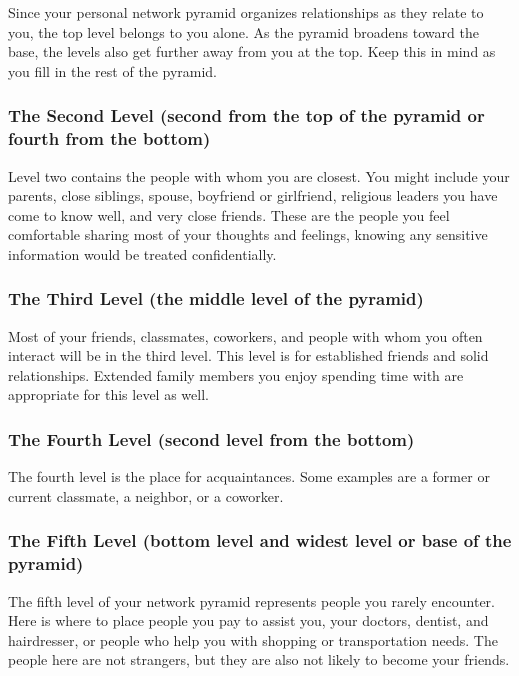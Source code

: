 Since your personal network pyramid organizes relationships as they relate to you, the top level belongs to you alone. As the pyramid broadens toward the base, the levels also get further away from you at the top. Keep this in mind as you fill in the rest of the pyramid.

\subsubsection*{The Second Level (second from the top of the pyramid or fourth from the bottom)}

Level two contains the people with whom you are closest. You might include your parents, close siblings, spouse, boyfriend or girlfriend, religious leaders you have come to know well, and very close friends. These are the people you feel comfortable sharing most of your thoughts and feelings, knowing any sensitive information would be treated confidentially.

\subsubsection*{The Third Level (the middle level of the pyramid)}

Most of your friends, classmates, coworkers, and people with whom you often interact will be in the third level. This level is for established friends and solid relationships. Extended family members you enjoy spending time with are appropriate for this level as well.

\subsubsection*{The Fourth Level (second level from the bottom)}

The fourth level is the place for acquaintances. Some examples are a former or current classmate, a neighbor, or a coworker.

\subsubsection*{The Fifth Level (bottom level and widest level or base of the pyramid)}

The fifth level of your network pyramid represents people you rarely encounter. Here is where to place people you pay to assist you, your doctors, dentist, and hairdresser, or people who help you with shopping or transportation needs. The people here are not strangers, but they are also not likely to become your friends.

